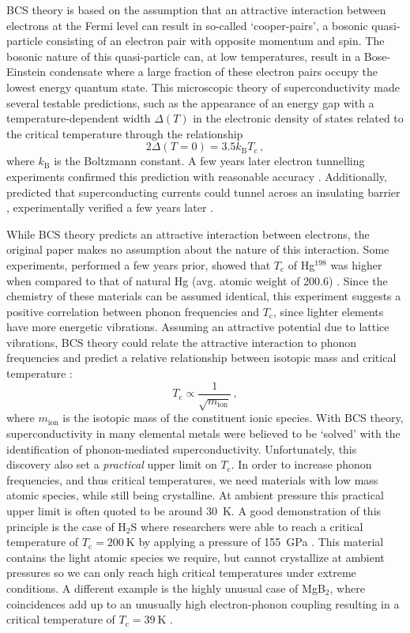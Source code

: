 BCS theory is based on the assumption that an attractive interaction between electrons at the Fermi level can result in so-called `cooper-pairs', a bosonic quasi-particle consisting of an electron pair with opposite momentum and spin. The bosonic nature of this quasi-particle can, at low temperatures, result in a Bose-Einstein condensate where a large fraction of these electron pairs occupy the lowest energy quantum state. This microscopic theory of superconductivity made several testable predictions, such as the appearance of an energy gap with a temperature-dependent width $\Delta(T)$ in the electronic density of states related to the critical temperature through the relationship
%
\[ 2\Delta(T=0) = 3.5 k_\text{B} T_\text{c} \, , \]
%
where $k_\text{B}$ is the Boltzmann constant. A few years later electron tunnelling experiments confirmed this prediction with reasonable accuracy \cite{Giaever1960, Giaever1960a}. Additionally, \citeauthor{Josephson1962} predicted that superconducting currents could tunnel across an insulating barrier \cite{Josephson1962}, experimentally verified a few years later \cite{Jaklevic1965}.

While BCS theory predicts an attractive interaction between electrons, the original paper \cite{Bardeen1957} makes no assumption about the nature of this interaction. Some experiments, performed a few years prior, showed that $T_\text{c}$ of Hg$^{198}$ was higher when compared to that of natural Hg (avg. atomic weight of 200.6) \cite{Maxwell1950, Reynolds1950}. Since the chemistry of these materials can be assumed identical, this experiment suggests a positive correlation between phonon frequencies and $T_\text{c}$, since lighter elements have more energetic vibrations. Assuming an attractive potential due to lattice vibrations, BCS theory could relate the attractive interaction to phonon frequencies and predict a relative relationship between isotopic mass and critical temperature \cite{DeLaunay1954}:
%
\[ T_\text{c} \propto \frac{1}{\sqrt{m_\text{ion}}} \, , \]
%
where $m_\text{ion}$ is the isotopic mass of the constituent ionic species. With BCS theory, superconductivity in many elemental metals were believed to be `solved' with the identification of phonon-mediated superconductivity. Unfortunately, this discovery also set a \emph{practical} upper limit on $T_\text{c}$. In order to increase phonon frequencies, and thus critical temperatures, we need materials with low mass atomic species, while still being crystalline. At ambient pressure this practical upper limit is often quoted to be around \SI{30}{\kelvin}. A good demonstration of this principle is the case of H$_2$S where researchers were able to reach a critical temperature of $T_\text{c} = \SI{200}{\kelvin}$ by applying a pressure of \SI{155}{\giga\pascal} \cite{Drozdov2015}. This material contains the light atomic species we require, but cannot crystallize at ambient pressures so we can only reach high critical temperatures under extreme conditions. A different example is the highly unusual case of MgB$_2$, where coincidences add up to an unusually high electron-phonon coupling resulting in a critical temperature of $T_\text{c} = \SI{39}{\kelvin}$ \cite{Nagamatsu2001}.


